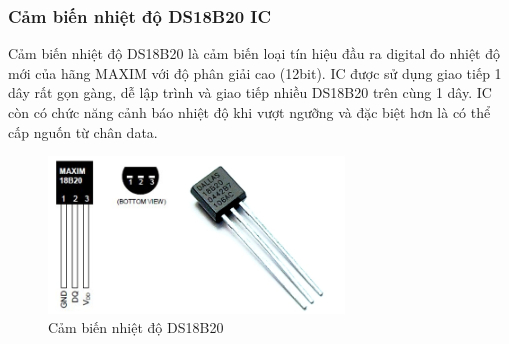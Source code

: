 \subsubsection*{Cảm biến nhiệt độ DS18B20 IC} 
Cảm biến nhiệt độ DS18B20 là cảm biến loại tín hiệu đầu ra digital đo nhiệt độ mới của hãng MAXIM với độ phân giải cao (12bit). IC được sử dụng giao tiếp 1 dây rất gọn gàng, dễ lập trình và giao tiếp nhiều DS18B20 trên cùng 1 dây. IC còn có chức năng cảnh báo nhiệt độ khi vượt ngưỡng và đặc biệt hơn là có thể cấp nguốn từ chân data.

\begin{figure}[H]
	\centering    
	\includegraphics[width=0.7\textwidth]{ds18b20}
	\caption[Cảm biến nhiệt độ DS18B20]{Cảm biến nhiệt độ DS18B20}
	\label{fig:ds18b20}
\end{figure}

